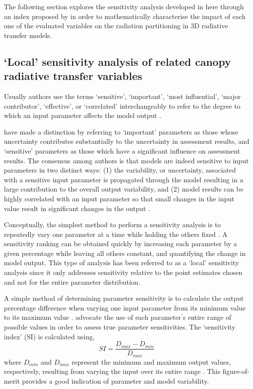 \documentclass[a4paper,11pt]{report}
\begin{document}
The following section explores the sensitivity analysis developed in here through an index proposed by \citet{Hoffman1983} in order to mathematically characterise the impact of each one of the evaluated variables on the radiation partitioning in 3D radiative transfer models. 

\subsection{`Local' sensitivity analysis of related canopy radiative transfer variables}\label{section:local}
Usually authors \citep{Downing1985,Iman1988} use the terms `sensitive', `important', `most influential', `major contributor', `effective', or `correlated' interchangeably to refer to the degree to which an input parameter affects the model output \citep{Hamby1994}.

\citet{Crick1987} have made a distinction by referring to `important' parameters as those whose uncertainty contributes substantially to the uncertainty in assessment results, and `sensitive' parameters as those which have a significant influence on assessment results. The consensus among authors is that models are indeed sensitive to input parameters in two distinct ways: (1) the variability, or uncertainty, associated with a sensitive input parameter is propagated through the model resulting in a large contribution to the overall output variability, and (2) model results can be highly correlated with an input parameter so that small changes in the input value result in significant changes in the output \citep{Hamby1994}.

Conceptually, the simplest method to perform a sensitivity analysis is to repeatedly vary one parameter at a time while holding the others fixed \citep{Downing1985,Crick1987}. A sensitivity ranking can be obtained quickly by increasing each parameter by a given percentage while leaving all others constant, and quantifying the change in model output. This type of analysis has been referred to as a `local' sensitivity analysis \citep{Crick1987} since it only addresses sensitivity relative to the point estimates chosen and not for the entire parameter distribution. 

A simple method of determining parameter sensitivity is to calculate the output percentage difference when varying one input parameter from its minimum value to its maximum value \citep{Hoffman1983,Bauer1991}. \citet{Hoffman1983} advocate the use of each parameter$^{\prime}$s entire range of possible values in order to assess true parameter sensitivities. The `sensitivity index' (SI) is calculated using,
\begin{equation}
SI = \frac{D_{max}-D_{min}}{D_{max}}
\label{equation:si}
\end{equation}
\noindent where $D_{min}$ and $D_{max}$ represent the minimum and maximum output values, respectively, resulting from varying the input over its entire range \citep{Hoffman1983}. This figure-of-merit provides a good indication of parameter and model variability.
\end{document}
